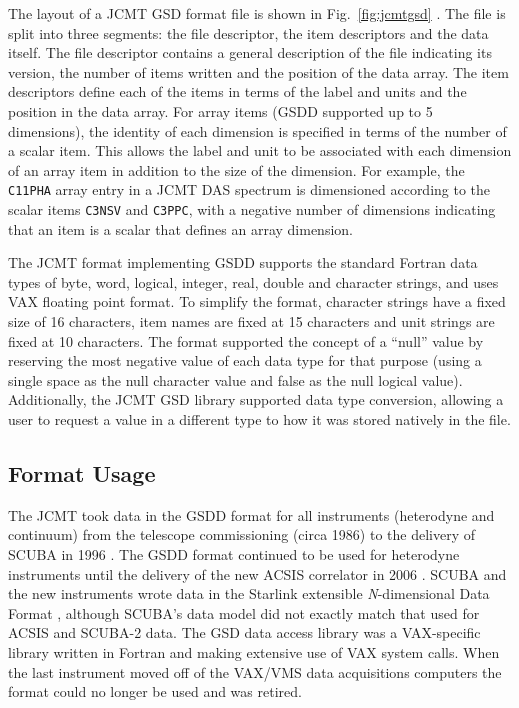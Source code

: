 \documentclass[final,authoryear,5p,times,twocolumn]{elsarticle}
\begin{document}
The layout of a JCMT GSD format file is shown in
Fig.~\ref{fig:jcmtgsd} \citep[see also][]{mtdn84}. The file is split
into three segments: the file descriptor, the item descriptors and the
data itself. The file descriptor contains a general description of the
file indicating its version, the number of items written and the
position of the data array. The item descriptors define each of the
items in terms of the label and units and the position in the data
array. For array items (GSDD supported up to 5 dimensions), the
identity of each dimension is specified in terms of the number of a
scalar item. This allows the label and unit to be associated with each
dimension of an array item in addition to the size of the
dimension. For example, the \texttt{C11PHA} array entry in a JCMT DAS
spectrum \citep{1986SPIE..598..134B} is dimensioned according to the
scalar items \texttt{C3NSV} and \texttt{C3PPC}, with a negative number
of dimensions indicating that an item is a scalar that defines an
array dimension.

The JCMT format implementing GSDD supports the standard Fortran data
types of byte, word, logical, integer, real, double and character
strings, and uses VAX floating point format. To simplify the format,
character strings have a fixed size of 16 characters, item names are
fixed at 15 characters and unit strings are fixed at 10
characters. The format supported the concept of a ``null'' value by
reserving the most negative value of each data type for that purpose
(using a single space as the null character value and false as the
null logical value). Additionally, the JCMT GSD library supported data
type conversion, allowing a user to request a value in a different
type to how it was stored natively in the file.

\subsection{Format Usage}

The JCMT took data in the GSDD format for all instruments (heterodyne
and continuum) from the telescope commissioning (circa 1986) to the
delivery of SCUBA in 1996 \citep{1999MNRAS.303..659H}. The GSDD format
continued to be used for heterodyne instruments until the delivery of
the new ACSIS correlator in 2006 \citep{2009MNRAS.399.1026B}. SCUBA
and the new instruments wrote data in the Starlink extensible
\emph{N}-dimensional Data Format \citep[NDF;][]{2015NDF}, although
SCUBA's data model did not exactly match that used for ACSIS and
SCUBA-2 \citep{2013MNRAS.430.2513H} data. The GSD data access library
was a VAX-specific library \citep{1986QJRAS..27..675.,mtdn84} written
in Fortran and making extensive use of VAX system calls. When
the last instrument moved off of the VAX/VMS data acquisitions computers
the format could no longer be used and was retired.
\end{document}
